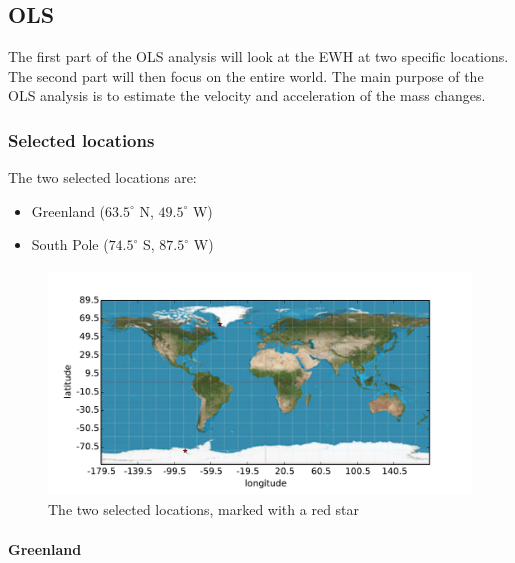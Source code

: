 \subsection{OLS}

The first part of the OLS analysis will look at the EWH at two specific locations. The second part will then focus on the entire world. The main purpose of the OLS analysis is to estimate the velocity and acceleration of the mass changes.

\subsubsection{Selected locations}

The two selected locations are:
\begin{itemize}
\item Greenland ($63.5^\circ$ N, $49.5^\circ$ W)
\item South Pole ($74.5^\circ$ S, $87.5^\circ$ W)
\end{itemize}
\begin{figure}[H]
	\centering
	\includegraphics[height=6cm]{figures/ols-selected-map}
	\caption{The two selected locations, marked with a red star}
\end{figure}

\paragraph{Greenland}

